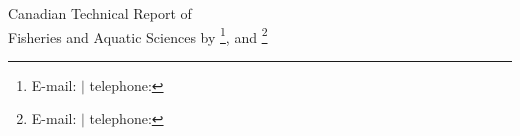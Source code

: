 \normalsize
{}
\thispagestyle{empty}
\noindent
\begin{center}
Canadian Technical Report of\\
Fisheries and Aquatic Sciences \trReportNum{}
\vfill
\trYear{}
\vfill
\trTitle{}
\vfill
by
\vfill
\trAuthALong\footnote{E-mail: \trAuthAEmail{} $|$ telephone: \trAuthAPhone{}},
and
\trAuthBLong\footnote{E-mail: \trAuthBEmail{} $|$ telephone: \trAuthBPhone{}}
\vfill
\trAddy{}
\end{center}
\clearpage

